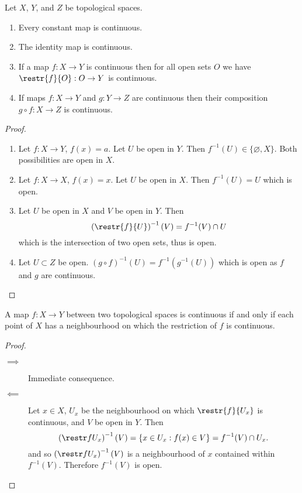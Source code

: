 \begin{proposition}[]
	\label{prop:function-continuous}
	Let $X$, $Y$, and $Z$ be topological spaces.
	\begin{enumerate}
		\item Every constant map is continuous.
		\item The identity map is continuous.
		\item If a map $f: X \to Y$ is continuous
			then for all open sets $O$ we have $\restr{f}{O}: O \to Y$ is
			continuous.
		\item If maps $f: X \to Y$ and $g: Y \to Z$ are continuous then
			their composition $g \circ f: X \to Z$ is continuous.
	\end{enumerate}
\end{proposition}

\begin{proof}
	\begin{enumerate}
		\item 
			Let $f: X \to Y$, $f(x) = a$.
			Let $U$ be open in $Y$.
			Then $f^{-1}(U) \in \{\varnothing, X\}$.
			Both possibilities are open in $X$.

		\item 
			Let $f: X \to X$, $f(x) = x$.
			Let $U$ be open in $X$.
			Then $f^{-1}(U) = U$ which is open.

		\item 
			Let $U$ be open in $X$ and $V$ be open in $Y$.
			Then \[
				\left(\restr{f}{U}\right)^{-1}(V) = f^{-1}(V) \cap U
			\]
			which is the intersection of two open sets, thus is open.
		
		\item
			Let $U \subset Z$ be open. $
				(g \circ f)^{-1}(U) = f^{-1}(g^{-1}(U))
			$ which is open as $f$ and $g$ are continuous.
	\end{enumerate}
\end{proof}

\begin{proposition}[]
	A map $f: X \to Y$ between two topological spaces is continuous if and only 
	if each point of $X$ has a neighbourhood on which the restriction of $f$ is
	continuous.
\end{proposition}

\begin{proof}
	\begin{description}
		\item[$\implies$] Immediate consequence.

		\item[$\impliedby$]
			Let $x \in X$, $U_x$ be the neighbourhood on which $\restr{f}{U_x}$ 
			is continuous, and $V$ be open in $Y$.
			Then
			\[
				\left( \restr f{U_x} \right)^{-1}(V)
				= \{ x \in U_x: f(x) \in V \}
				= f^{-1}(V) \cap U_x.
			\]
			and so $\left( \restr f{U_x} \right)^{-1}(V)$ is a neighbourhood of
			$x$ contained within $f^{-1}(V)$.
			Therefore $f^{-1}(V)$ is open.
	\end{description}
\end{proof}

